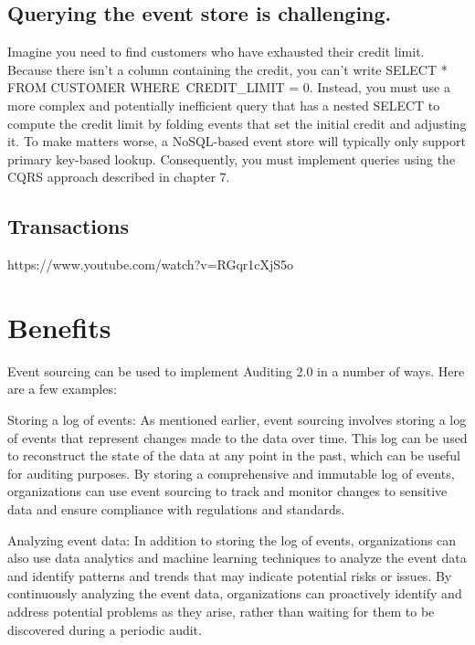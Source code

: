\subsection{Querying the event store is challenging.}

Imagine you need to find customers who have exhausted their credit limit. Because
there isn’t a column containing the credit, you can’t write SELECT * FROM CUSTOMER
WHERE\ CREDIT\_LIMIT = 0. Instead, you must use a more complex and potentially inefficient query that has a nested SELECT to compute the credit limit by folding events that
set the initial credit and adjusting it. To make matters worse, a NoSQL-based event
store will typically only support primary key-based lookup. Consequently, you must
implement queries using the CQRS approach described in chapter 7.~\citep{richardson2018microservices}

\subsection{Transactions}

https://www.youtube.com/watch?v=RGqr1cXjS5o


\section{Benefits}


Event sourcing can be used to implement Auditing 2.0 in a number of ways. Here are a few examples:

Storing a log of events: As mentioned earlier, event sourcing involves storing a log of events that represent changes made to the data over time. This log can be used to reconstruct the state of the data at any point in the past, which can be useful for auditing purposes. By storing a comprehensive and immutable log of events, organizations can use event sourcing to track and monitor changes to sensitive data and ensure compliance with regulations and standards.

Analyzing event data: In addition to storing the log of events, organizations can also use data analytics and machine learning techniques to analyze the event data and identify patterns and trends that may indicate potential risks or issues. By continuously analyzing the event data, organizations can proactively identify and address potential problems as they arise, rather than waiting for them to be discovered during a periodic audit.

